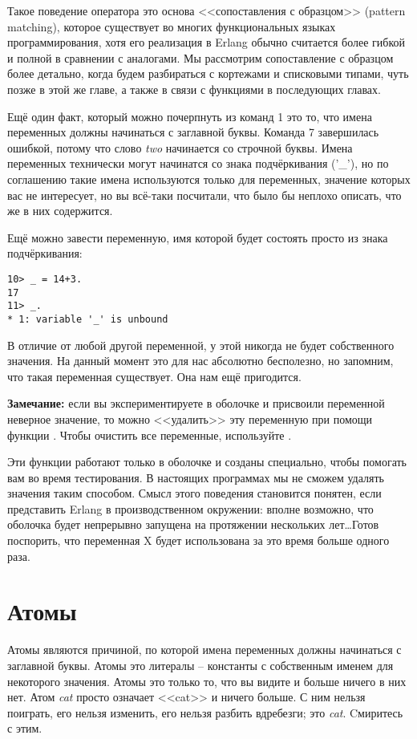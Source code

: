 Такое поведение оператора \ops{\strut=} это основа <<сопоставления с образцом>> (pattern matching), которое существует во многих функциональных языках программирования, хотя его реализация в Erlang обычно считается более гибкой и полной в сравнении с аналогами. Мы рассмотрим сопоставление с образцом более детально, когда будем разбираться с кортежами и списковыми типами, чуть позже в этой же главе, а также в связи с функциями в последующих главах.

Ещё один факт, который можно почерпнуть из команд 1 это то, что имена переменных должны начинаться с заглавной буквы. Команда 7 завершилась ошибкой, потому что слово \emph{two} начинается со строчной буквы. Имена переменных технически могут начинатся со знака подчёркивания ('\_'), но по соглашению такие имена используются только для переменных, значение которых вас не интересует, но вы всё\--таки посчитали, что было бы неплохо описать, что же в них содержится.

Ещё можно завести переменную, имя которой будет состоять просто из знака подчёркивания:
\begin{lstlisting}[style=repl]
10> _ = 14+3.
17
11> _.
* 1: variable '_' is unbound
\end{lstlisting}

В отличие от любой другой переменной, у этой никогда не будет собственного значения. На данный момент это для нас абсолютно бесполезно, но запомним, что такая переменная существует. Она нам ещё пригодится.\\ 
\colorbox{lgray}
{
\begin{minipage}{1.0\linewidth}
\textbf{Замечание:} если вы экспериментируете в оболочке и присвоили переменной неверное значение, то можно <<удалить>> эту переменную при помощи функции . Чтобы очистить все переменные, используйте .
\par 
Эти функции работают только в оболочке и созданы специально, чтобы помогать вам во время тестирования. В настоящих программах мы не сможем удалять значения таким способом. Смысл этого поведения становится понятен, если представить Erlang в производственном окружении: вполне возможно, что оболочка будет непрерывно запущена на протяжении нескольких лет\ldots Готов поспорить, что переменная X будет использована за это время больше одного раза.
\end{minipage}
}
\section{Атомы}\label{atoms}
Атомы являются причиной, по которой имена переменных должны начинаться с заглавной буквы. Атомы это литералы \--- константы с собственным именем для некоторого значения. Атомы это только то, что вы видите и больше ничего в них нет. Атом \emph{cat} просто означает <<cat>> и ничего больше. С ним нельзя поиграть, его нельзя изменить, его нельзя разбить вдребезги; это \emph{cat}. Cмиритесь с этим.

